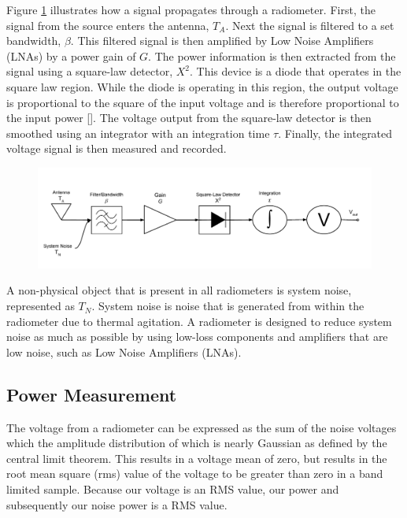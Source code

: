 Figure \ref{trad_radiometer} illustrates how a signal propagates through a radiometer.  First, the signal from the source enters the antenna, $T_A$.  Next the signal is filtered to a set bandwidth, $\beta$.  This filtered signal is then amplified by Low Noise Amplifiers (LNAs) by a power gain of $G$.  The power information is then extracted from the signal using a square-law detector, $X^2$.  This device is a diode that operates in the square law region.  While the diode is operating in this region, the output voltage is proportional to the square of the input voltage and is therefore proportional to the input power [\cite{Leinweber}].  The voltage output from the square-law detector is then smoothed using an integrator with an integration time $\tau$.  Finally, the integrated voltage signal is then measured and recorded.

{\begin{figure}[h!tb] 
\centering
\includegraphics[width=\textwidth]{Images/Traditional_Radiometer.pdf}
\label{trad_radiometer}
\end{figure}
}

A non-physical object that is present in all radiometers is system noise, represented as $T_{N}$.  System noise is noise that is generated from within the radiometer due to thermal agitation.  A radiometer is designed to reduce system noise as much as possible by using low-loss components and amplifiers that are low noise, such as Low Noise Amplifiers (LNAs). 

\subsection{Power Measurement}\label{pwr_measurement}
The voltage from a radiometer can be expressed as the sum of the noise voltages which the amplitude distribution of which is nearly Gaussian as defined by the central limit theorem.  This results in a voltage mean of zero, but results in the root mean square (rms) value of the voltage to be greater than zero in a band limited sample.  Because our voltage is an RMS value, our power and subsequently our noise power is a RMS value.

